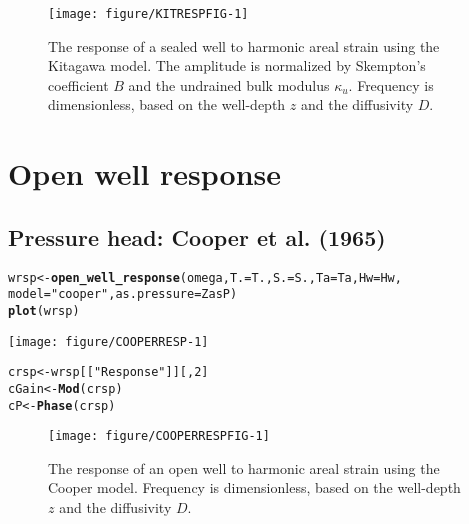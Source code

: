 \documentclass[12pt]{article}\usepackage[]{graphicx}\usepackage[]{xcolor}
\makeatletter
\def\maxwidth{ %
  \ifdim\Gin@nat@width>\linewidth
    \linewidth
  \else
    \Gin@nat@width
  \fi
}
\newcommand{\hlnum}[1]{\textcolor[rgb]{0.686,0.059,0.569}{#1}}%
\newcommand{\hlsng}[1]{\textcolor[rgb]{0.192,0.494,0.8}{#1}}%
\newcommand{\hldef}[1]{\textcolor[rgb]{0.345,0.345,0.345}{#1}}%
\newcommand{\hlkwb}[1]{\textcolor[rgb]{0.69,0.353,0.396}{#1}}%
\newcommand{\hlkwc}[1]{\textcolor[rgb]{0.333,0.667,0.333}{#1}}%
\newcommand{\hlkwd}[1]{\textcolor[rgb]{0.737,0.353,0.396}{\textbf{#1}}}%
\newenvironment{kframe}{%
 \def\at@end@of@kframe{}%
 \ifinner\ifhmode%
  \def\at@end@of@kframe{\end{minipage}}%
  \begin{minipage}{\columnwidth}%
 \fi\fi%
 \def\FrameCommand##1{\hskip\@totalleftmargin \hskip-\fboxsep
 \colorbox{shadecolor}{##1}\hskip-\fboxsep
     \hskip-\linewidth \hskip-\@totalleftmargin \hskip\columnwidth}%
 \MakeFramed {\advance\hsize-\width
   \@totalleftmargin\z@ \linewidth\hsize
   \@setminipage}}%
 {\par\unskip\endMakeFramed%
 \at@end@of@kframe}
\newenvironment{knitrout}{}{} %
\makeatother
\begin{document}
\begin{figure}[htb!]
\begin{center}
\begin{knitrout}\small
{}\color{fgcolor}
\texttt{[image: figure/KITRESPFIG-1]} 
\end{knitrout}
\caption{The response of a sealed well to harmonic areal strain using
the Kitagawa model. The amplitude is normalized by Skempton's coefficient $B$
and the undrained bulk modulus $\kappa_u$.
Frequency is dimensionless, based on the well-depth $z$ and the diffusivity $D$.
}
\label{fig:wrsp}
\end{center}
\end{figure}

\clearpage
\section{Open well response}

\subsection{Pressure head: Cooper et al. (1965)}

\begin{knitrout}\small
{}\color{fgcolor}\begin{kframe}
\begin{alltt}
\hldef{wrsp} \hlkwb{<-} \hlkwd{open_well_response}\hldef{(omega,} \hlkwc{T.} \hldef{= T.,} \hlkwc{S.} \hldef{= S.,} \hlkwc{Ta} \hldef{= Ta,} \hlkwc{Hw} \hldef{= Hw,}
    \hlkwc{model} \hldef{=} \hlsng{"cooper"}\hldef{,} \hlkwc{as.pressure} \hldef{= ZasP)}
\hlkwd{plot}\hldef{(wrsp)}
\end{alltt}
\end{kframe}
\texttt{[image: figure/COOPERRESP-1]} 
\begin{kframe}\begin{alltt}
\hldef{crsp} \hlkwb{<-} \hldef{wrsp[[}\hlsng{"Response"}\hldef{]][,} \hlnum{2}\hldef{]}
\hldef{cGain} \hlkwb{<-} \hlkwd{Mod}\hldef{(crsp)}
\hldef{cP} \hlkwb{<-} \hlkwd{Phase}\hldef{(crsp)}
\end{alltt}
\end{kframe}
\end{knitrout}

\begin{figure}[htb!]
\begin{center}
\begin{knitrout}\small
{}\color{fgcolor}
\texttt{[image: figure/COOPERRESPFIG-1]} 
\end{knitrout}
\caption{The response of an open well to harmonic areal strain using
the Cooper model. 
Frequency is dimensionless, based on the well-depth $z$ and the diffusivity $D$.
}
\label{fig:owrsp-coop}
\end{center}
\end{figure}
\end{document}
